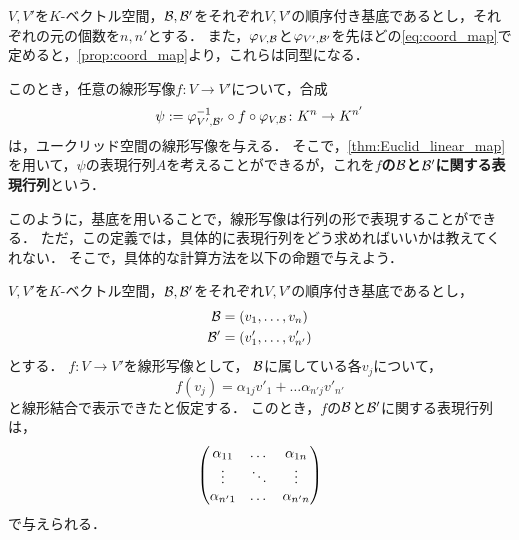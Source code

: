 \begin{dfn}\label{dfn:representative_matrix}
    $V,V'$を$K$-ベクトル空間，$\mathcal{B},\mathcal{B}'$をそれぞれ$V,V'$の順序付き基底であるとし，それぞれの元の個数を$n,n'$とする．
    また，$\varphi_{V,\mathcal{B}}$と$\varphi_{V',\mathcal{B}'}$を先ほどの\eqref{eq:coord_map}で定めると，\cref{prop:coord_map}より，これらは同型になる．
    
    このとき，任意の線形写像$f \colon V \to V'$について，合成
    \[
        \psi := \varphi_{V',\mathcal{B}'}^{-1} \circ f \circ \varphi_{V,\mathcal{B}} \colon K^n \to K^{n'}
    \]
    は，ユークリッド空間の線形写像を与える．
    そこで，\cref{thm:Euclid_linear_map}を用いて，$\psi$の表現行列$A$を考えることができるが，これを\textbf{$f$の$\mathcal{B}$と$\mathcal{B}'$に関する表現行列}という．
\end{dfn}
このように，基底を用いることで，線形写像は行列の形で表現することができる．
ただ，この定義では，具体的に表現行列をどう求めればいいかは教えてくれない．
そこで，具体的な計算方法を以下の命題で与えよう．
\begin{prop}\label{prop:rep_matrix_calc}
    $V,V'$を$K$-ベクトル空間，$\mathcal{B},\mathcal{B}'$をそれぞれ$V,V'$の順序付き基底であるとし，
    \[
        \begin{aligned}
            \mathcal{B} &= (v_1,\dots,v_n) \\
            \mathcal{B}' &= (v'_1,\dots,v'_{n'})
        \end{aligned}
    \]
    とする．
    $f \colon V \to V'$を線形写像として，
    $\mathcal{B}$に属している各$v_j$について，
    \[
        f(v_j) = \alpha_{1j} v'_1 + \dots \alpha_{n'j} v'_{n'}
    \]
    と線形結合で表示できたと仮定する．
    このとき，$f$の$\mathcal{B}$と$\mathcal{B}'$に関する表現行列は，
    \[
        \pmt{\alpha_{11} & \dots & \alpha_{1n} \\%
        \vdots & \ddots & \vdots \\%
        \alpha_{n'1} & \dots & \alpha_{n'n}}
    \]
    で与えられる．
\end{prop}
